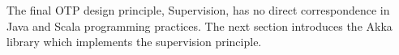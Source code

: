 The final OTP design principle, Supervision, has no direct correspondence in 
Java and Scala programming practices.  The next section introduces the Akka 
library which implements the supervision principle.






\begin{comment}

\section{The Erlang Programming Language}

Erlang \citep{erlang_history, ArmstrongErlang} is a dynamically typed 
functional programming language originally designed at the Ericsson Computer 
Science Laboratory for implementing telephony applications 
\citep{erlang_history}.  After using the Erlang language for in-house 
applications for ten years, when Erlang was released as open source in 1998, 
Erlang developers summarised five design principles shipped with the Erlang/OTP 
library, which stands for Erlang Open Telecom Platform \citep{erlang_history, 
OTP}.

Erlang, collaborates with other languages, provides fault-tolerant support for 
enterprise-level distributed real-time applications. One of the early OTP 
applications, Ericsson’s AXD 301 switch, is reported to have achieved nine “9”s 
availability, that is 99.9999999\% of uptime, during the nine months experiment 
\citep{ArmstrongAXD}.  Up to the present, 
Erlang has been widely used in database systems (e.g. Mnesia, Riak, and Amazon 
SimpleDB) and messaging services (e.g. RabbitMQ and WhatsApp).

This section gives a brief introduction to the Erlang programming language and 
OTP design principles, based on related material in \citep{ArmstrongErlang} and 
\citep{ErlangManual, ErlangStart, OTP}.




\subsection{Actor Programming in Erlang}

(This section summarises material from \citep[Chapter 8]{ArmstrongErlang} and 
\citep[Chapter 3]{ErlangStart})

\vspace{12 pt}

An Erlang application consists of one or more module files, each of which 
defines a set of functions.  The notion of the Erlang {\it process} minimizes 
the gap between sequential programming and concurrent programming.  In Erlang, 
a process is a thread of function execution.  It can receive messages of any 
type via its process identifier (pid).  Defining an Actor in Erlang is as 
simple as providing a {\tt receive} block for the body of the function spawned 
in a process.



\end{comment}
